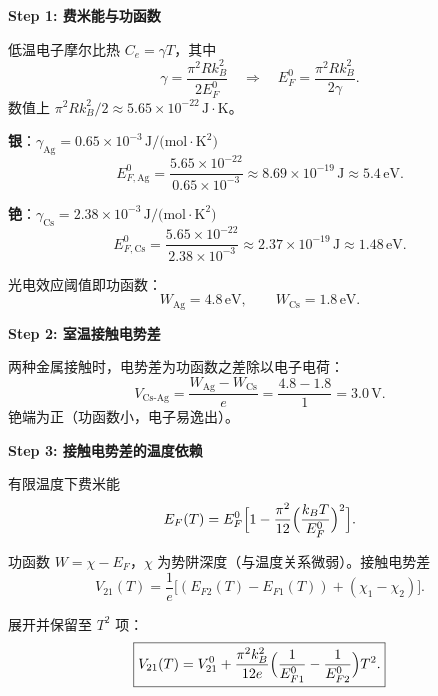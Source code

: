 \begin{derivationbox}[标准解题过程]
\textbf{Step 1: 费米能与功函数}

低温电子摩尔比热 $C_e=\gamma T$，其中
\begin{equation}
\gamma=\frac{\pi^2Rk_B^2}{2E_F^0}
\quad\Longrightarrow\quad
E_F^0=\frac{\pi^2Rk_B^2}{2\gamma}.
\end{equation}
数值上 $\pi^2Rk_B^2/2\approx5.65\times10^{-22}\,\text{J}\cdot\text{K}$。

\textbf{银}：$\gamma_{\text{Ag}}=0.65\times10^{-3}\,\text{J/(mol}\cdot\text{K}^2)$
\begin{equation}
E_{F,\text{Ag}}^0=\frac{5.65\times10^{-22}}{0.65\times10^{-3}}
\approx8.69\times10^{-19}\,\text{J}\approx\boxed{5.4\,\text{eV}.}
\end{equation}

\textbf{铯}：$\gamma_{\text{Cs}}=2.38\times10^{-3}\,\text{J/(mol}\cdot\text{K}^2)$
\begin{equation}
E_{F,\text{Cs}}^0=\frac{5.65\times10^{-22}}{2.38\times10^{-3}}
\approx2.37\times10^{-19}\,\text{J}\approx\boxed{1.48\,\text{eV}.}
\end{equation}

光电效应阈值即功函数：
\begin{equation}
\boxed{W_{\text{Ag}}=4.8\,\text{eV},\qquad W_{\text{Cs}}=1.8\,\text{eV}.}
\end{equation}

\textbf{Step 2: 室温接触电势差}

两种金属接触时，电势差为功函数之差除以电子电荷：
\begin{equation}
\boxed{V_{\text{Cs-Ag}}=\frac{W_{\text{Ag}}-W_{\text{Cs}}}{e}=\frac{4.8-1.8}{1}=3.0\,\text{V}.}
\end{equation}
铯端为正（功函数小，电子易逸出）。

\textbf{Step 3: 接触电势差的温度依赖}

有限温度下费米能
\begin{equation}
E_F(T)=E_F^0\Bigl[1-\frac{\pi^2}{12}\Bigl(\frac{k_BT}{E_F^0}\Bigr)^2\Bigr].
\end{equation}

功函数 $W=\chi-E_F$，$\chi$ 为势阱深度（与温度关系微弱）。接触电势差
\begin{equation}
V_{21}(T)=\frac{1}{e}\bigl[(E_{F2}(T)-E_{F1}(T))+(\chi_1-\chi_2)\bigr].
\end{equation}

展开并保留至 $T^2$ 项：
\begin{equation}
\boxed{V_{21}(T)=V_{21}^0+\frac{\pi^2k_B^2}{12e}\Bigl(\frac{1}{E_{F1}^0}-\frac{1}{E_{F2}^0}\Bigr)T^2.}
\end{equation}


\end{derivationbox}
